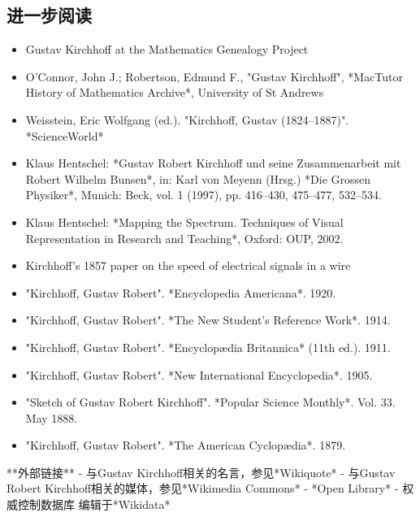 \subsection{进一步阅读}  
\begin{itemize}
\item Gustav Kirchhoff at the Mathematics Genealogy Project  
\item O'Connor, John J.; Robertson, Edmund F., "Gustav Kirchhoff", *MacTutor History of Mathematics Archive*, University of St Andrews  
\item Weisstein, Eric Wolfgang (ed.). "Kirchhoff, Gustav (1824–1887)". *ScienceWorld*  
\item Klaus Hentschel: *Gustav Robert Kirchhoff und seine Zusammenarbeit mit Robert Wilhelm Bunsen*, in: Karl von Meyenn (Hrsg.) *Die Grossen Physiker*, Munich: Beck, vol. 1 (1997), pp. 416–430, 475–477, 532–534.  
\item Klaus Hentschel: *Mapping the Spectrum. Techniques of Visual Representation in Research and Teaching*, Oxford: OUP, 2002.  
\item Kirchhoff's 1857 paper on the speed of electrical signals in a wire 
\end{itemize} 
\begin{itemize}
\item "Kirchhoff, Gustav Robert". *Encyclopedia Americana*. 1920.  
\item "Kirchhoff, Gustav Robert". *The New Student's Reference Work*. 1914.  
\item "Kirchhoff, Gustav Robert". *Encyclopædia Britannica* (11th ed.). 1911.  
\item "Kirchhoff, Gustav Robert". *New International Encyclopedia*. 1905.  
\item "Sketch of Gustav Robert Kirchhoff". *Popular Science Monthly*. Vol. 33. May 1888.  
\item "Kirchhoff, Gustav Robert". *The American Cyclopædia*. 1879. 
\end{itemize} 

**外部链接**  
- 与Gustav Kirchhoff相关的名言，参见*Wikiquote*  
- 与Gustav Robert Kirchhoff相关的媒体，参见*Wikimedia Commons*  
- *Open Library*  
- 权威控制数据库 编辑于*Wikidata*